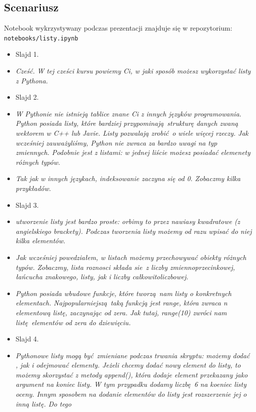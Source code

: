 \documentclass{mwart}
\begin{document}
\subsection{Scenariusz}
Notebook wykrzystywany podczas prezentacji znajduje się w repozytorium: \texttt{notebooks/listy.ipynb}
\begin{itemize}
  \item Slajd 1.
  \item \emph{Cześć. W tej cześci kursu powiemy Ci, w jaki sposób możesz wykorzystać
      listy z Pythona. }
  \item Slajd 2.
  \item \emph{W Pythonie nie istnieją tablice znane Ci z innych języków
      programowania. Python posiada listy, które bardziej przypominają strukturę danych
      zwaną wektorem w C++ lub Javie. Listy pozwalają zrobić o wiele więcej rzeczy. Jak
      wcześniej zauważyliśmy, Python nie zwraca za bardzo uwagi na typ zmiennych.
      Podobnie jest z listami: w jednej liście możesz posiadać elemenety różnych typów. }
  \item \emph{Tak jak w innych językach, indeksowanie zaczyna się od 0. Zobaczmy kilka
      przykładów.}
  \item Slajd 3.
  \item \emph{utworzenie listy jest bardzo proste: orbimy to przez nawiasy kwadratowe
      (z angielskiego brackety). Podczas tworzenia listy możemy od razu wpisać do niej
      kilka elementów.}
  \item \emph{Jak wcześniej powedziałem, w listach możemy przechowywać obiekty różnych
      typów. Zobaczmy, lista roznosci składa sie z liczby zmiennoprzecinkowej, łańcucha
      znakowego, listy, jak i liczby całkowitoliczbowej.}
  \item \emph{Python posiada wbudowe funkcje, które tworzą nam listy o konkretnych
      elementach. Najpopularniejszą taką funkcją jest range, która zwraca
      n elementową listę, zaczynając od zera. Jak tutaj, range(10) zwróci nam
      listę elementów od zera do dziewięciu.}
  \item Slajd 4.
  \item \emph{Pythonowe listy mogą być zmieniane podczas trwania skryptu: możemy dodać ,
      jak i odejmować elementy. Jeżeli chcemy dodać nowy element do listy, to możemy
      skorzystać z metody append(), która dodaje element przekazany jako argument na
      koniec listy. W tym przypadku dodamy liczbę 6 na koeniec listy oceny. Innym
      sposobem na dodanie elementów do listy jest rozszerzenie jej o inną listę. Do tego
}
\end{itemize}
\end{document}
